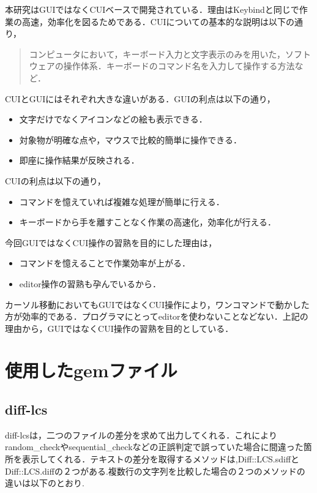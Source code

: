 本研究はGUIではなくCUIベースで開発されている．理由はKeybindと同じで作業の高速，効率化を図るためである．CUIについての基本的な説明は以下の通り，
\begin{quotation}
コンピュータにおいて，キーボード入力と文字表示のみを用いた，ソフトウェアの操作体系．キーボードのコマンド名を入力して操作する方法など． \cite{cui}
\end{quotation}CUIとGUIにはそれぞれ大きな違いがある．GUIの利点は以下の通り，

\begin{itemize}
\tightlist
\item
  文字だけでなくアイコンなどの絵も表示できる．
\item
  対象物が明確な点や，マウスで比較的簡単に操作できる．
\item
  即座に操作結果が反映される．
\end{itemize}
CUIの利点は以下の通り，

\begin{itemize}
\tightlist
\item
  コマンドを憶えていれば複雑な処理が簡単に行える．
\item
  キーボードから手を離すことなく作業の高速化，効率化が行える．
\end{itemize}

今回GUIではなくCUI操作の習熟を目的にした理由は，

\begin{itemize}
\tightlist
\item
  コマンドを憶えることで作業効率が上がる．
\item
  editor操作の習熟も孕んでいるから．
\end{itemize}
カーソル移動においてもGUIではなくCUI操作により，ワンコマンドで動かした方が効率的である．プログラマにとってeditorを使わないことなどない．上記の理由から，GUIではなくCUI操作の習熟を目的としている．

    \section{使用したgemファイル}\label{ux4f7fux7528ux3057ux305fgemux30d5ux30a1ux30a4ux30eb}

    \subsection{diff-lcs}\label{diff-lcs}

diff-lcsは，二つのファイルの差分を求めて出力してくれる．これによりrandom\_checkやsequential\_checkなどの正誤判定で誤っていた場合に間違った箇所を表示してくれる．テキストの差分を取得するメソッドは,Diff::LCS.sdiffと Diff::LCS.diffの２つがある.複数行の文字列を比較した場合の２つのメソッドの違いは以下のとおり.

